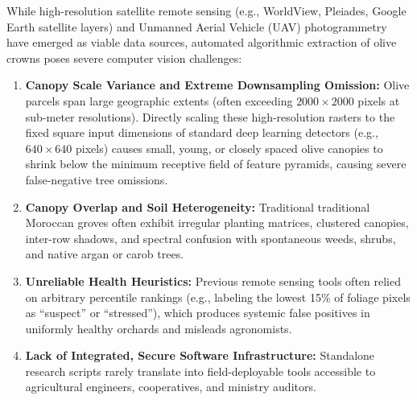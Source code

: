 \documentclass[runningheads]{llncs}
\begin{document}
While high-resolution satellite remote sensing (e.g., WorldView, Pleiades, Google Earth satellite layers) and Unmanned Aerial Vehicle (UAV) photogrammetry have emerged as viable data sources, automated algorithmic extraction of olive crowns poses severe computer vision challenges:
\begin{enumerate}
    \item \textbf{Canopy Scale Variance and Extreme Downsampling Omission:} Olive parcels span large geographic extents (often exceeding $2000 \times 2000$ pixels at sub-meter resolutions). Directly scaling these high-resolution rasters to the fixed square input dimensions of standard deep learning detectors (e.g., $640 \times 640$ pixels) causes small, young, or closely spaced olive canopies to shrink below the minimum receptive field of feature pyramids, causing severe false-negative tree omissions.
    \item \textbf{Canopy Overlap and Soil Heterogeneity:} Traditional traditional Moroccan groves often exhibit irregular planting matrices, clustered canopies, inter-row shadows, and spectral confusion with spontaneous weeds, shrubs, and native argan or carob trees.
    \item \textbf{Unreliable Health Heuristics:} Previous remote sensing tools often relied on arbitrary percentile rankings (e.g., labeling the lowest 15\% of foliage pixels as ``suspect'' or ``stressed''), which produces systemic false positives in uniformly healthy orchards and misleads agronomists.
    \item \textbf{Lack of Integrated, Secure Software Infrastructure:} Standalone research scripts rarely translate into field-deployable tools accessible to agricultural engineers, cooperatives, and ministry auditors.
\end{enumerate}
\end{document}
